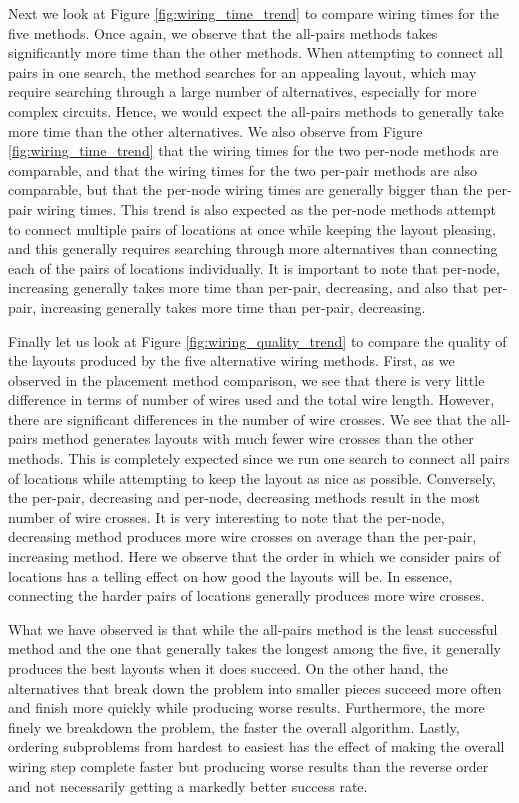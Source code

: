 Next we look at Figure \ref{fig:wiring_time_trend} to compare wiring times for
the five methods. Once again, we observe that the all-pairs methods takes
significantly more time than the other methods. When attempting to connect all
pairs in one search, the method searches for an appealing layout, which may
require searching through a large number of alternatives, especially for more
complex circuits. Hence, we would expect the all-pairs methods to generally take
more time than the other alternatives. We also observe from Figure
\ref{fig:wiring_time_trend} that the wiring times for the two per-node methods
are comparable, and that the wiring times for the two per-pair methods are also
comparable, but that the per-node wiring times are generally bigger than the
per-pair wiring times. This trend is also expected as the per-node methods
attempt to connect multiple pairs of locations at once while keeping the layout
pleasing, and this generally requires searching through more alternatives than
connecting each of the pairs of locations individually. It is important to note
that per-node, increasing generally takes more time than per-pair, decreasing,
and also that per-pair, increasing generally takes more time than per-pair,
decreasing.

Finally let us look at Figure \ref{fig:wiring_quality_trend} to compare the
quality of the layouts produced by the five alternative wiring methods. First,
as we observed in the placement method comparison, we see that there is very
little difference in terms of number of wires used and the total wire length.
However, there are significant differences in the number of wire crosses. We see
that the all-pairs method generates layouts with much fewer wire crosses than
the other methods. This is completely expected since we run one search to
connect all pairs of locations while attempting to keep the layout as nice as
possible. Conversely, the per-pair, decreasing and per-node, decreasing methods
result in the most number of wire crosses. It is very interesting to note that
the per-node, decreasing method produces more wire crosses on average than the
per-pair,
increasing method. Here we observe that the order in which we consider pairs of
locations has a telling effect on how good the layouts will be. In essence,
connecting the harder pairs of locations generally produces more wire crosses.

What we have observed is that while the all-pairs method is the least successful
method and the one that generally takes the longest among the five,
it generally produces the best layouts when it does succeed. On the other hand,
the alternatives that break down the problem into smaller pieces succeed more
often and finish more quickly while producing worse results. Furthermore,
the more finely we breakdown the problem, the faster the overall algorithm.
Lastly, ordering subproblems from hardest to easiest has the effect of making the
overall wiring step complete faster but producing worse results than the reverse
order and not necessarily getting a markedly better success rate.

